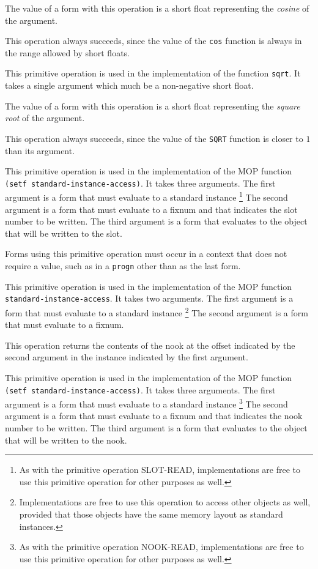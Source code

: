 The value of a form with this operation is a short float representing
the \emph{cosine} of the argument.

This operation always succeeds, since the value of the \texttt{cos}
function is always in the range allowed by short floats.

 {}

This primitive operation is used in the implementation of the
\commonlisp{} function \texttt{sqrt}.  It takes a single argument which
much be a non-negative short float.

The value of a form with this operation is a short float representing
the \emph{square root} of the argument.

This operation always succeeds, since the value of the \texttt{SQRT}
function is closer to $1$ than its argument.

 {}

This primitive operation is used in the implementation of the MOP
function \texttt{(setf standard-instance-access)}.  It takes three
arguments.  The first argument is a form that must evaluate to a
standard instance%
\footnote{As with the primitive operation SLOT-READ, implementations
  are free to use this primitive operation for other purposes as
  well.}
The second argument is a form that must evaluate to a fixnum and that
indicates the slot number to be written.  The third argument is a form
that evaluates to the object that will be written to the slot.

Forms using this primitive operation must occur in a context that does
not require a value, such as in a \texttt{progn} other than as the
last form.

 {}

This primitive operation is used in the implementation of the MOP
function \texttt{standard-instance-access}.  It takes two arguments.
The first argument is a form that must evaluate to a standard
instance%
\footnote{Implementations are free to use this operation to access
  other objects as well, provided that those objects have the same
  memory layout as standard instances.}
The second argument is a form that must evaluate to a fixnum.

This operation returns the contents of the nook at the offset
indicated by the second argument in the instance indicated by the
first argument.

 {}

This primitive operation is used in the implementation of the MOP
function \texttt{(setf standard-instance-access)}.  It takes three
arguments.  The first argument is a form that must evaluate to a
standard instance%
\footnote{As with the primitive operation NOOK-READ, implementations
  are free to use this primitive operation for other purposes as
  well.}
The second argument is a form that must evaluate to a fixnum and that
indicates the nook number to be written.  The third argument is a form
that evaluates to the object that will be written to the nook.

